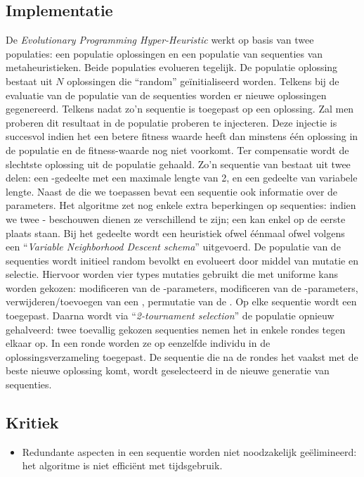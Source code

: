 \subsection{Implementatie}
De \emph{Evolutionary Programming Hyper-Heuristic}\cite{chesc-eph} werkt op basis van twee populaties: een populatie oplossingen en een populatie van sequenties van metaheuristieken. Beide populaties evolueren tegelijk. De populatie oplossing bestaat uit $N$ oplossingen die ``random'' ge\"initialiseerd worden. Telkens bij de evaluatie van de populatie van de sequenties worden er nieuwe oplossingen gegenereerd. Telkens nadat zo'n sequentie is toegepast op een oplossing. Zal men proberen dit resultaat in de populatie proberen te injecteren. Deze injectie is succesvol indien het een betere fitness waarde heeft dan minstens \'e\'en oplossing in de populatie en de fitness-waarde nog niet voorkomt. Ter compensatie wordt de slechtste oplossing uit de populatie gehaald. Zo'n sequentie van \abllhn{} bestaat uit twee delen: een \abpt{}-gedeelte met een maximale lengte van 2, en een \abls{} gedeelte van variabele lengte. Naast de \abllhn{} die we toepassen bevat een sequentie ook informatie over de parameters. Het algoritme zet nog enkele extra beperkingen op sequenties: indien we twee \abpt{}-\abhn{} beschouwen dienen ze verschillend te zijn; een \abpt{} \abh{} kan enkel op de eerste plaats staan. Bij het \abls{} gedeelte wordt een heuristiek ofwel \'e\'enmaal ofwel volgens een ``\emph{Variable Neighborhood Descent schema}''\cite{hom/vns} uitgevoerd. De populatie van de sequenties wordt initieel random bevolkt en evolueert door middel van mutatie en selectie. Hiervoor worden vier types mutaties gebruikt die met uniforme kans worden gekozen: modificeren van de \abpt{}-parameters, modificeren van de \abls{}-parameters, verwijderen/toevoegen van een \abpt{}, permutatie van de \abls{} \abhn{}. Op elke sequentie wordt een \abmt{} toegepast. Daarna wordt via ``\emph{2-tournament selection}''\cite{Miller95geneticalgorithms} de populatie opnieuw gehalveerd: twee toevallig gekozen sequenties nemen het in enkele rondes tegen elkaar op. In een ronde worden ze op eenzelfde individu in de oplossingsverzameling toegepast. De sequentie die na de rondes het vaakst met de beste nieuwe oplossing komt, wordt geselecteerd in de nieuwe generatie van sequenties.
\subsection{Kritiek}
\begin{itemize}
 \item Redundante aspecten in een sequentie worden niet noodzakelijk ge\"elimineerd: het algoritme is niet effici\"ent met tijdsgebruik.
\end{itemize}

